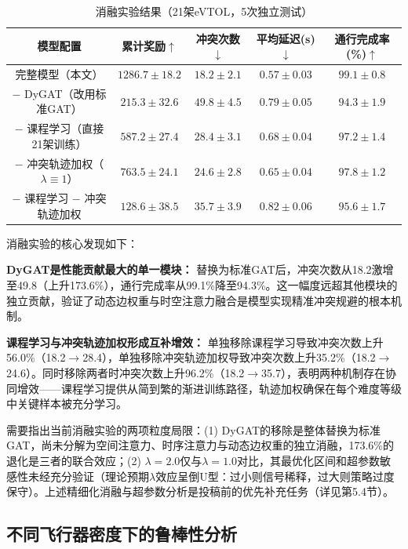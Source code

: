 \documentclass[12pt,a4paper,UTF8]{ctexart}
\begin{document}
\begin{table}[H]
    \centering
    \caption{消融实验结果（21架eVTOL，5次独立测试）}
    \label{tab:ablation}
    \begin{tabular}{|c|c|c|c|c|}
        \hline
        \textbf{模型配置} & \textbf{累计奖励$\uparrow$} & \textbf{冲突次数$\downarrow$} & \textbf{平均延迟(s)$\downarrow$} & \textbf{通行完成率(\%)$\uparrow$} \\
        \hline
        完整模型（本文） & $\mathbf{1286.7 \pm 18.2}$ & $\mathbf{18.2 \pm 2.1}$ & $\mathbf{0.57 \pm 0.03}$ & $\mathbf{99.1 \pm 0.8}$ \\
        $-$ DyGAT（改用标准GAT） & $215.3 \pm 32.6$ & $49.8 \pm 4.5$ & $0.79 \pm 0.05$ & $94.3 \pm 1.9$ \\
        $-$ 课程学习（直接21架训练） & $587.2 \pm 27.4$ & $28.4 \pm 3.1$ & $0.68 \pm 0.04$ & $97.2 \pm 1.4$ \\
        $-$ 冲突轨迹加权（$\lambda\equiv1$） & $763.5 \pm 24.1$ & $24.6 \pm 2.8$ & $0.65 \pm 0.04$ & $97.8 \pm 1.2$ \\
        $-$ 课程学习 $-$ 冲突轨迹加权 & $128.6 \pm 38.5$ & $35.7 \pm 3.9$ & $0.82 \pm 0.06$ & $95.6 \pm 1.7$ \\
        \hline
    \end{tabular}
\end{table}

消融实验的核心发现如下：

\textbf{DyGAT是性能贡献最大的单一模块：} 替换为标准GAT后，冲突次数从18.2激增至49.8（上升173.6\%），通行完成率从99.1\%降至94.3\%。这一幅度远超其他模块的独立贡献，验证了动态边权重与时空注意力融合是模型实现精准冲突规避的根本机制。

\textbf{课程学习与冲突轨迹加权形成互补增效：} 单独移除课程学习导致冲突次数上升56.0\%（18.2$\to$28.4），单独移除冲突轨迹加权导致冲突次数上升35.2\%（18.2$\to$24.6）。同时移除两者时冲突次数上升96.2\%（18.2$\to$35.7），表明两种机制存在协同增效——课程学习提供从简到繁的渐进训练路径，轨迹加权确保在每个难度等级中关键样本被充分学习。

需要指出当前消融实验的两项粒度局限：(1) DyGAT的移除是整体替换为标准GAT，尚未分解为空间注意力、时序注意力与动态边权重的独立消融，173.6\%的退化是三者的联合效应；(2) $\lambda=2.0$仅与$\lambda=1.0$对比，其最优化区间和超参数敏感性未经充分验证（理论预期$\lambda$效应呈倒U型：过小则信号稀释，过大则策略过度保守）。上述精细化消融与超参数分析是投稿前的优先补充任务（详见第5.4节）。

\subsection{不同飞行器密度下的鲁棒性分析}
\end{document}
